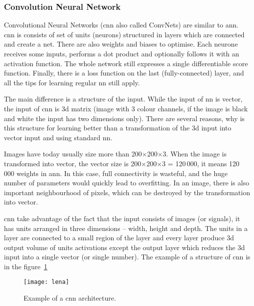 \documentclass[thesis=M,english]{FITthesis}[2012/10/20]
\begin{document}
\subsubsection{Convolution Neural Network}\label{sec:cnn}

Convolutional Neural Networks (\gls{cnn} also called ConvNets) are similar to \gls{ann}.\cite{Johnson2017cnn} \gls{cnn} is consists of set of units (neurons) structured in layers which are connected and create a net. There are also weights and biases to optimise. Each neurone receives some inputs, performs a dot product and optionally follows it with an activation function. The whole network still expresses a single differentiable score function. Finally, there is a loss function on the last (fully-connected) layer, and all the tips for learning regular \gls{nn} still apply.

The main difference is a structure of the input. While the input of \gls{nn} is vector, the input of \gls{cnn} is \gls{3d} matrix (image with 3 colour channels, if the image is black and white the input has two dimensions only).\cite{Johnson2017cnn} There are several reasons,  why is this structure for learning better than a transformation of the \gls{3d} input into vector input and using standard \gls{nn}. 

Images have today usually size more than 200$\times$200$\times$3. When the image is transformed into vector, the vector size is 200$\times$200$\times$3 = 120\,000, it means 120\,000 weights in \gls{ann}. In this case, full connectivity is wasteful, and the huge number of parameters would quickly lead to overfitting. In an image, there is also important neighbourhood of pixels, which can be destroyed by the transformation into vector.\cite{Johnson2017cnn}

\gls{cnn} take advantage of the fact that the input consists of images (or signals), it has units arranged in three dimensions -- width, height and depth. The units in a layer are connected to a small region of the layer and every layer produce \gls{3d} output volume of units activations except the output layer which reduces the \gls{3d} input into a single vector (or single number). The example of a structure of \gls{cnn} is in the figure~\ref{fig:cnn}

\vspace*{0.5cm}

\begin{figure}[ht]\centering
    \texttt{[image: lena]}
    \caption{Example of a \gls{cnn} architecture.\cite{lena}}\label{fig:cnn}
\end{figure}
\end{document}
